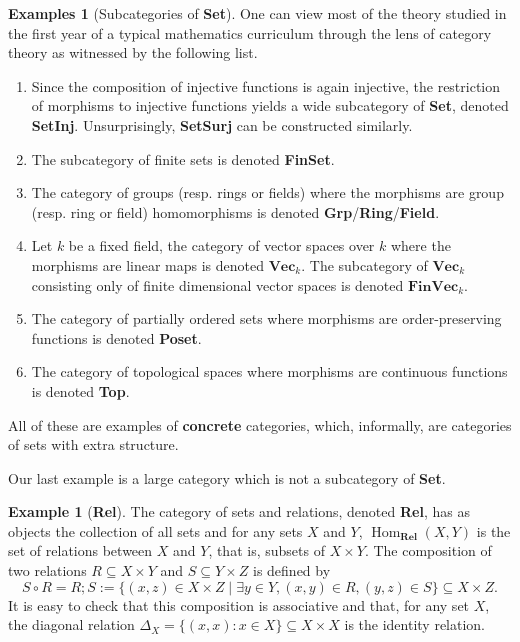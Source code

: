 \documentclass{article}
\theoremstyle{definition}
\newtheorem{exmp}[thm]{Example}
\newtheorem{exmps}[thm]{Examples}
\theoremstyle{remark}
\DeclareMathOperator{\Hom}{Hom}
\begin{document}
\begin{exmps}[Subcategories of \textbf{Set}]\label{exmp-subcatSet}
	One can view most of the theory studied in the first year of a typical mathematics curriculum through the lens of category theory as witnessed by the following list.
	\begin{enumerate}
		\item Since the composition of injective functions is again injective, the restriction of morphisms to injective functions yields a wide subcategory of \textbf{Set}, denoted \textbf{SetInj}. Unsurprisingly, \textbf{SetSurj} can be constructed similarly.
		\item The subcategory of finite sets is denoted \textbf{FinSet}.
		\item The category of groups (resp. rings or fields) where the morphisms are group (resp. ring or field) homomorphisms is denoted \textbf{Grp}/\textbf{Ring}/\textbf{Field}.
		\item Let $k$ be a fixed field, the category of vector spaces over $k$ where the morphisms are linear maps is denoted $\textbf{Vec}_k$. The subcategory of $\textbf{Vec}_k$ consisting only of finite dimensional vector spaces is denoted $\textbf{FinVec}_k$.
		\item The category of partially ordered sets where morphisms are order-preserving functions is denoted \textbf{Poset}.
		\item The category of topological spaces where morphisms are continuous functions is denoted \textbf{Top}.
	\end{enumerate}
	All of these are examples of \textbf{concrete} categories, which, informally, are categories of sets with extra structure.
\end{exmps}

Our last example is a large category which is not a subcategory of \textbf{Set}.
\begin{exmp}[\textbf{Rel}]
    The category of sets and relations, denoted \textbf{Rel}, has as objects the collection of all sets and for any sets $X$ and $Y$, $\Hom_{\textbf{Rel}}(X,Y)$ is the set of relations between $X$ and $Y$, that is, subsets of $X\times Y$. The composition of two relations $R \subseteq X\times Y$ and $S \subseteq Y\times Z$ is defined by
    \[S\circ R = R;S := \{(x,z) \in X\times Z \mid \exists y \in Y, (x,y) \in R, (y,z) \in S\} \subseteq X \times Z.\]
    It is easy to check that this composition is associative and that, for any set $X$, the diagonal relation $\Delta_X = \{(x,x) : x \in X\} \subseteq X \times X$ is the identity relation.
\end{exmp}
\end{document}
